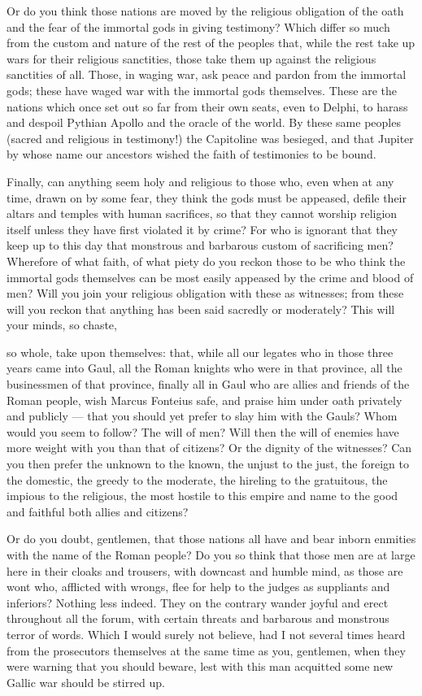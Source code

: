  Or do you think those nations are moved by the religious obligation of the oath and the fear of the immortal gods in giving testimony? Which differ so much from the custom and nature of the rest of the peoples that, while the rest take up wars for their religious sanctities, those take them up against the religious sanctities of all. Those, in waging war, ask peace and pardon from the immortal gods; these have waged war with the immortal gods themselves. These are the nations which once set out so far from their own seats, even to Delphi, to harass and despoil Pythian Apollo and the oracle of the world. By these same peoples (sacred and religious in testimony!) the Capitoline was besieged, and that Jupiter by whose name our ancestors wished the faith of testimonies to be bound.

 Finally, can anything seem holy and religious to those who, even when at any time, drawn on by some fear, they think the gods must be appeased, defile their altars and temples with human sacrifices, so that they cannot worship religion itself unless they have first violated it by crime? For who is ignorant that they keep up to this day that monstrous and barbarous custom of sacrificing men? Wherefore of what faith, of what piety do you reckon those to be who think the immortal gods themselves can be most easily appeased by the crime and blood of men? Will you join your religious obligation with these as witnesses; from these will you reckon that anything has been said sacredly or moderately? This will your minds, so chaste,

 so whole, take upon themselves: that, while all our legates who in those three years came into Gaul, all the Roman knights who were in that province, all the businessmen of that province, finally all in Gaul who are allies and friends of the Roman people, wish Marcus Fonteius safe, and praise him under oath privately and publicly --- that you should yet prefer to slay him with the Gauls? Whom would you seem to follow? The will of men? Will then the will of enemies have more weight with you than that of citizens? Or the dignity of the witnesses? Can you then prefer the unknown to the known, the unjust to the just, the foreign to the domestic, the greedy to the moderate, the hireling to the gratuitous, the impious to the religious, the most hostile to this empire and name to the good and faithful both allies and citizens?

 Or do you doubt, gentlemen, that those nations all have and bear inborn enmities with the name of the Roman people? Do you so think that those men are at large here in their cloaks and trousers, with downcast and humble mind, as those are wont who, afflicted with wrongs, flee for help to the judges as suppliants and inferiors? Nothing less indeed. They on the contrary wander joyful and erect throughout all the forum, with certain threats and barbarous and monstrous terror of words. Which I would surely not believe, had I not several times heard from the prosecutors themselves at the same time as you, gentlemen, when they were warning that you should beware, lest with this man acquitted some new Gallic war should be stirred up.

